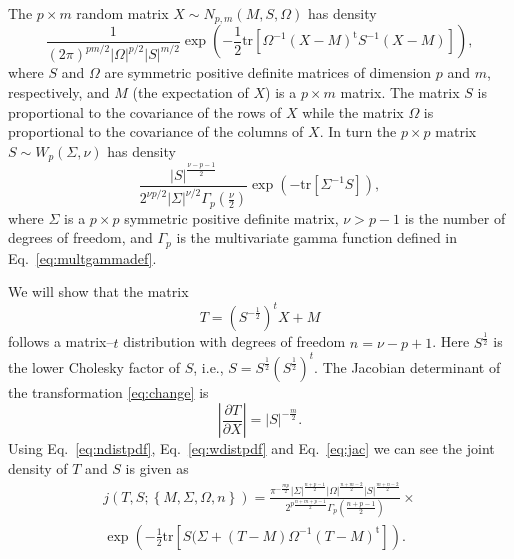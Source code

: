 \documentclass[english,listof=totoc]{scrartcl}
\begin{document}
The $p\times m$ random matrix $X \sim N_{p,m}(M,S,\Omega)$ has density
\begin{equation}
	\frac{1}{(2\pi)^{pm/2}|\Omega|^{p/2}|S|^{m/2}}\exp\left(-\frac{1}{2}\textrm{tr}\left[\Omega^{-1}(X-M)^{\textrm{t}}S^{-1}(X-M)\right]\right),\label{eq:ndistpdf}
\end{equation}
where $S$ and $\Omega$ are symmetric positive definite matrices of dimension $p$ and $m$, respectively, and $M$ (the expectation of $X$) is a $p\times m$ matrix. The matrix $S$ is proportional to the covariance of the rows of $X$ while the matrix $\Omega$ is proportional to the covariance of the columns of $X$. In turn the $p\times p$ matrix $S\sim W_{p}\left(\Sigma,\nu\right)$ has density
\begin{equation}
\frac{|S|^{\frac{\nu-p-1}{2}}}{2^{\nu p/2}|\Sigma|^{\nu/2}\Gamma_{p}(\frac{\nu}{2})}\exp\left(-\textrm{tr}\left[\Sigma^{-1}S\right]\right),\label{eq:wdistpdf}
\end{equation}
where $\Sigma$ is a $p\times p$ symmetric positive definite matrix, $\nu>p-1$
is the number of degrees of freedom, and $\Gamma_{p}$ is the
multivariate gamma function defined in Eq.~\eqref{eq:multgammadef}.

We will show that the matrix
\begin{equation}
T=(S^{-\frac{1}{2}})^{t}X+M\label{eq:change}
\end{equation}
follows a matrix--$t$ distribution with degrees of freedom $n=\nu-p+1$. Here $S^{\frac{1}{2}}$ is the lower Cholesky factor of $S$, i.e., $S=S^{\frac{1}{2}}(S^{\frac{1}{2}})^t$. The Jacobian determinant of the transformation \eqref{eq:change} is
\begin{equation}
\left|\frac{\partial T}{\partial X}\right|=|S|^{-\frac{m}{2}}.\label{eq:jac}
\end{equation}
Using Eq.~\eqref{eq:ndistpdf}, Eq.~\eqref{eq:wdistpdf} and Eq.~\eqref{eq:jac} we can see the joint density of $T$ and $S$ is given as
\begin{equation}
\begin{split}j(T,S;\left\{M,\Sigma,\Omega,n\right\})=\frac{\pi^{-\frac{mp}{2}}|\Sigma|^{\frac{n+p-1}{2}}|\Omega|^{\frac{n+m-2}{2}}|S|^{\frac{m+n-2}{2}}}{2^{p\frac{n+m+p-1}{2}}\Gamma_{p}(\frac{n+p-1}{2})}\times\\
\exp\left(-\frac{1}{2}\textrm{tr}\left[S(\Sigma+(T-M)\Omega^{-1}(T-M)^{\textrm{t}}\right]\right).
\end{split}
\label{eq:jointpdf}
\end{equation}
\end{document}
